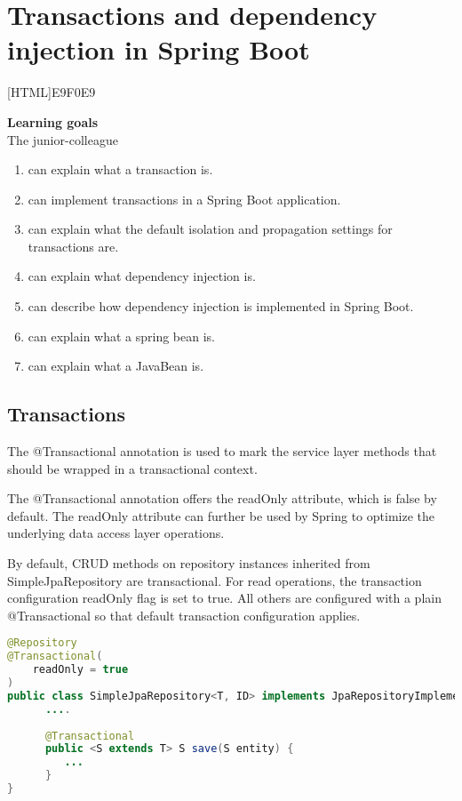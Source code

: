 \chapter{Transactions and dependency injection in Spring Boot}

[HTML]{E9F0E9}{\parbox{\textwidth}{%
\noindent \textbf{Learning goals}\\
The junior-colleague
\begin{enumerate}[nolistsep]
\item can explain what a transaction is.
\item can implement transactions in a Spring Boot application.
\item can explain what the default isolation and propagation settings for transactions are.
\item can explain what dependency injection is.
\item can describe how dependency injection is implemented in Spring Boot.
\item can explain what a spring bean is.
\item can explain what a JavaBean is.
\end{enumerate}}}

\section{Transactions}

The @Transactional annotation is used to mark the service layer methods that should be wrapped in a transactional context.

The @Transactional annotation offers the readOnly attribute, which is false by default. The readOnly attribute can further be used by Spring to optimize the underlying data access layer operations.

By default, CRUD methods on repository instances inherited from SimpleJpaRepository are transactional. For read operations, the transaction configuration readOnly flag is set to true. All others are configured with a plain @Transactional so that default transaction configuration applies.

\begin{lstlisting}[frame=single, language=java]
@Repository
@Transactional(
    readOnly = true
)
public class SimpleJpaRepository<T, ID> implements JpaRepositoryImplementation<T, ID> { 
      ....
      
      @Transactional
      public <S extends T> S save(S entity) {
         ...
      }
}
\end{lstlisting}

